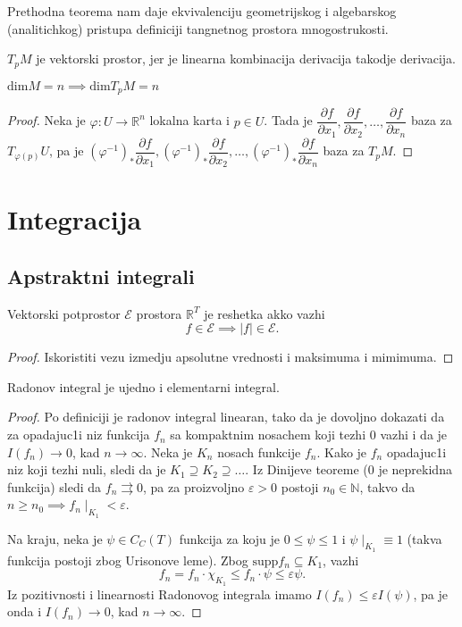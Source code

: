 \documentclass[a4paper,12pt]{article}
\newcommand{\NN}{\mathbb{N}}
\newcommand{\RR}{\mathbb{R}}
\newcommand{\eps}{\varepsilon}
\newcommand{\psj}{\subseteq}
\renewcommand{\dim}{\mathrm{dim}}
\begin{document}
\begin{nap}
	Prethodna teorema nam daje ekvivalenciju geometrijskog i algebarskog (analitichkog) pristupa
	definiciji tangnetnog prostora mnogostrukosti.
\end{nap}

\begin{posl}
	$T_p M$ je vektorski prostor, jer je linearna kombinacija derivacija takodje derivacija.
\end{posl}

\begin{posl}
	$\dim M = n \implies \dim T_p M = n$
\end{posl}
\begin{proof}
	Neka je $\varphi : U \to \RR^n$ lokalna karta i $p \in U$. Tada je 
	$\dfrac{\partial f}{\partial x_1}, \dfrac{\partial f}{\partial x_2}, \dotso, \dfrac{\partial f}{\partial x_n}$
	baza za $T_{\varphi(p)} U$, pa je 
	$(\varphi^{-1})_*\dfrac{\partial f}{\partial x_1}, (\varphi^{-1})_*\dfrac{\partial f}{\partial x_2}, \dotso, (\varphi^{-1})_*\dfrac{\partial f}{\partial x_n}$
	baza za $T_p M$.
\end{proof}

\section{Integracija}

\subsection{Apstraktni integrali}

\begin{lema}
	Vektorski potprostor $\mathcal{E}$ prostora $\RR^T$ je reshetka akko vazhi
	\[ f \in \mathcal{E} \implies |f| \in \mathcal{E} .\]
\end{lema}
\begin{proof}
	Iskoristiti vezu izmedju apsolutne vrednosti i maksimuma i mimimuma.
\end{proof}

\begin{tvr}
	Radonov integral je ujedno i elementarni integral.
\end{tvr}
\begin{proof}
	Po definiciji je radonov integral linearan, tako da je dovoljno dokazati da 
	za opadajuc1i niz funkcija $f_n$ sa kompaktnim nosachem koji tezhi $0$
	vazhi i da je $I(f_n) \to 0$, kad $n\to \infty$. Neka je $K_n$ nosach funkcije
	$f_n$. Kako je $f_n$ opadajuc1i niz koji tezhi nuli, sledi da je $K_1\supseteq K_2 \supseteq \dotso$.
	Iz Dinijeve teoreme ($0$ je neprekidna funkcija) sledi da $f_n\rightrightarrows 0$, pa za proizvoljno
	$\eps > 0$ postoji $n_0 \in \NN$, takvo da $n\geq n_0 \implies f_n\mid_{K_1} < \eps$.

	Na kraju, neka je $\psi \in  C_C(T)$ funkcija za koju je $0 \leq \psi \leq 1$ i $\psi \mid_{K_1} \equiv 1$ (takva
	funkcija postoji zbog Urisonove leme). Zbog $\mathrm{supp} f_n \psj K_1$, vazhi
	\[ f_n = f_n \cdot \chi_{K_1} \leq f_n \cdot \psi \leq \eps \psi .\] 
	Iz pozitivnosti i linearnosti Radonovog integrala imamo $I(f_n) \leq \eps I(\psi)$, pa je onda i $I(f_n)\to 0$, kad
	$n\to \infty$.
\end{proof}
\end{document}
